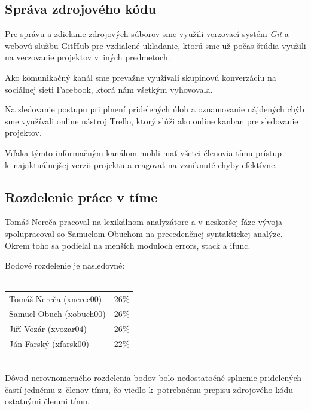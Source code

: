 \documentclass{article}
\begin{document}
        \subsection{Správa zdrojového kódu}
        Pre správu a zdielanie zdrojových súborov sme využili verzovací systém \emph{Git} a webovú službu GitHub pre vzdialené ukladanie, ktorú sme už 
        počas štúdia využili na verzovanie projektov v~iných predmetoch.
        
        Ako komunikačný kanál sme 
        prevažne využívali skupinovú konverzáciu na sociálnej sieti Facebook, ktorá nám všetkým 
        vyhovovala.
        
        Na sledovanie postupu pri plnení pridelených úloh a oznamovanie nájdených chýb 
        sme využívali online nástroj Trello, ktorý slúži ako online kanban pre sledovanie projektov. 
        
        Vďaka týmto informačným kanálom mohli mať všetci členovia tímu prístup k~najaktuálnejšej
        verzii projektu a reagovať na vzniknuté chyby efektívne.

        \newpage
        \subsection{Rozdelenie práce v tíme}

        Tomáš Nereča pracoval na lexikálnom analyzátore a v neskoršej fáze vývoja spolupracoval so Samuelom Obuchom na 
        precedenčnej syntaktickej analýze. Okrem toho sa podieľal na menších moduloch errors, stack a ifunc. 

        Bodové rozdelenie je nasledovné:\\~\\

        \begin{tabular}{l l}
            Tomáš Nereča (xnerec00) & 26\% \\
            Samuel Obuch (xobuch00) & 26\% \\
            Jiří Vozár (xvozar04)   & 26\% \\
            Ján Farský (xfarsk00)   & 22\% \\
        \end{tabular} \\

        Dôvod nerovnomerného rozdelenia bodov bolo nedostatočné splnenie pridelených častí jednému 
        z~členov tímu, čo viedlo k~potrebnému prepisu zdrojového kódu ostatnými členmi tímu.
\end{document}
